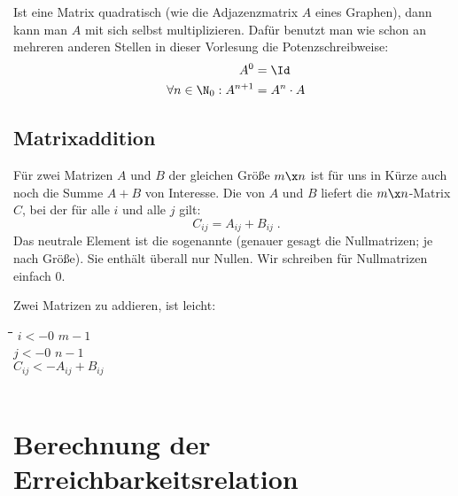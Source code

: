 \noindent
Ist eine Matrix quadratisch (wie \zB die Adjazenzmatrix $A$ eines
Graphen), dann kann man $A$ mit sich selbst multiplizieren. Dafür
benutzt man wie schon an mehreren anderen Stellen in dieser Vorlesung
die Potenzschreibweise:
\begin{align*}
  A^0 &= \Id \\
  \forall n\in\N_0: A^{n+1} &= A^n \cdot A
\end{align*}


\Tut\subsection{Matrixaddition}
\label{sub:matadd}

Für zwei Matrizen $A$ und $B$ der gleichen Größe $m\x n$ ist für uns
in Kürze auch noch die Summe $A+B$ von Interesse. Die
 von $A$ und $B$ liefert die $m\x n$-Matrix $C$, bei der
für alle $i$ und alle $j$ gilt:
\[
C_{ij} = A_{ij}+ B_{ij}   \;.
\]
Das neutrale Element ist die sogenannte
 (genauer gesagt die
Nullmatrizen; je nach Größe). Sie enthält überall nur Nullen. Wir
schreiben für Nullmatrizen einfach $0$.

Zwei Matrizen zu addieren, ist leicht:

\begin{tabbing}
  \quad\=\quad\=\quad\=\quad\=\quad\=\hspace*{30mm}\=\kill
  \> $i <- 0$  $m-1$ \\
  \>\> $j <- 0$  $n-1$   \\
  \>\>\>\> $C_{ij} <- A_{ij} + B_{ij}$ \\
  \>\> \\
  \> 
\end{tabbing}
 
\Tut\section{Berechnung der Erreichbarkeitsrelation}
\label{sec:e-stern}

